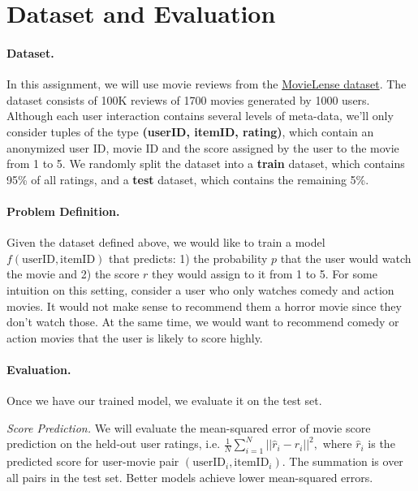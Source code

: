 \documentclass[12pt]{article}
\begin{document}
\section{Dataset and Evaluation}

\paragraph{Dataset.} In this assignment, we will use movie reviews from the \href{https://grouplens.org/datasets/movielens/100k}{MovieLense dataset}. The dataset consists of 100K reviews of 1700 movies generated by 1000 users. Although each user interaction contains several levels of meta-data, we'll only consider tuples of the type \textbf{(userID, itemID, rating)}, which contain an anonymized user ID, movie ID and the score assigned by the user to the movie from 1 to 5. We randomly split the dataset into a \textbf{train} dataset, which contains 95\% of all ratings, and a \textbf{test} dataset, which contains the remaining 5\%.

\paragraph{Problem Definition.}
Given the dataset defined above, we would like to train a model $f(\text{userID}, \text{itemID})$ that predicts: 1) the probability $p$ that the user would watch the movie and 2) the score $r$ they would assign to it from 1 to 5. For some intuition on this setting, consider a user who only watches comedy and action movies. It would not make sense to recommend them a horror movie since they don't watch those. At the same time, we would want to recommend comedy or action movies that the user is likely to score highly. 

\paragraph{Evaluation.}
Once we have our trained model, we evaluate it on the test set.

\vspace{0.2cm}
\noindent \emph{Score Prediction.} We will evaluate the mean-squared error of movie score prediction on the held-out user ratings, i.e.
    $
        \frac{1}{N}\sum_{i=1}^N ||\hat{r}_i-r_i||^2,
    $
    where $\hat{r}_i$ is the predicted score for user-movie pair $(\text{userID}_i,\text{itemID}_i)$. The summation is over all pairs in the test set. Better models achieve lower mean-squared errors.
    
\end{document}
